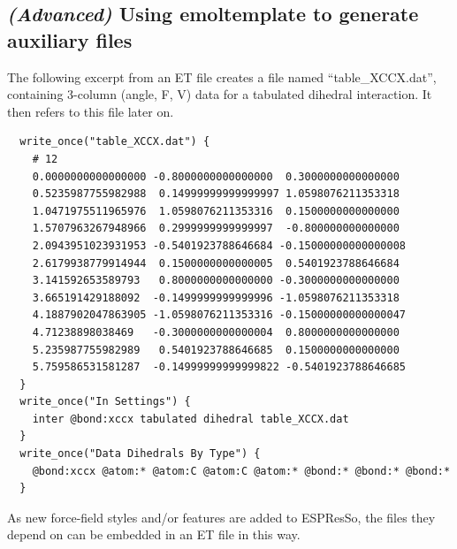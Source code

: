 \documentclass[11pt]{article}
\begin{document}
\subsection{\textit{(Advanced)} 
             Using emoltemplate to generate auxiliary files}
\label{sec:aux_files}
The following excerpt from an ET file 
creates a file named ``table\_XCCX.dat'', containing 
3-column (angle, F, V) data for a tabulated dihedral interaction.
It then refers to this file later on.
\begin{verbatim}
  write_once("table_XCCX.dat") {
    # 12
    0.0000000000000000 -0.8000000000000000  0.3000000000000000
    0.5235987755982988  0.14999999999999997 1.0598076211353318
    1.0471975511965976  1.0598076211353316  0.1500000000000000
    1.5707963267948966  0.2999999999999997  -0.800000000000000
    2.0943951023931953 -0.5401923788646684 -0.15000000000000008
    2.6179938779914944  0.1500000000000005  0.5401923788646684
    3.141592653589793   0.8000000000000000 -0.3000000000000000
    3.665191429188092  -0.1499999999999996 -1.0598076211353318
    4.1887902047863905 -1.0598076211353316 -0.15000000000000047
    4.71238898038469   -0.3000000000000004  0.8000000000000000
    5.235987755982989   0.5401923788646685  0.1500000000000000
    5.759586531581287  -0.14999999999999822 -0.5401923788646685
  }
  write_once("In Settings") {
    inter @bond:xccx tabulated dihedral table_XCCX.dat
  }
  write_once("Data Dihedrals By Type") {
    @bond:xccx @atom:* @atom:C @atom:C @atom:* @bond:* @bond:* @bond:*
  }
\end{verbatim}
As new force-field styles and/or features are added to ESPResSo, 
the files they depend on can be embedded in an ET file in this way. 


\end{document}
